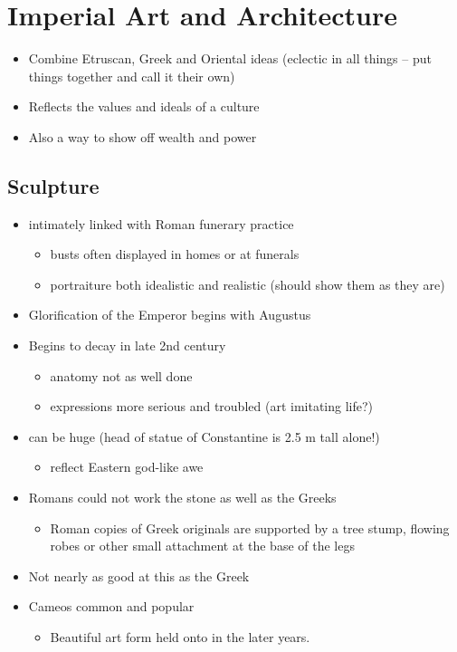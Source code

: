 \documentclass[12pt, twoside]{article}
\begin{document}
\section{Imperial Art and Architecture}
\begin{itemize}
\item Combine Etruscan, Greek and Oriental ideas (eclectic in all things – put things together and call it their own)
\item Reflects the values and ideals of a culture
\item Also a way to show off wealth and power
\end{itemize}

\subsection{Sculpture}
\begin{itemize}
\item intimately linked with Roman funerary practice
	\begin{itemize}
	\item busts often displayed in homes or at funerals
	\item portraiture both idealistic and realistic (should show them as they are)
	\end{itemize}
\item Glorification of the Emperor begins with Augustus
\item Begins to decay in late 2nd century
	\begin{itemize}
	\item anatomy not as well done
	\item expressions more serious and troubled (art imitating life?)
	\end{itemize}
\item can be huge (head of statue of Constantine is 2.5 m tall alone!)
	\begin{itemize}
	\item reflect Eastern god-like awe
	\end{itemize}
\item Romans could not work the stone as well as the Greeks
	\begin{itemize}
	\item Roman copies of Greek originals are supported by a tree stump, flowing robes or other small attachment at the base of the legs
	\end{itemize}
\item Not nearly as good at this as the Greek
\item Cameos common and popular
	\begin{itemize}
	\item Beautiful art form held onto in the later years.
	\end{itemize}
\end{itemize}
\end{document}
